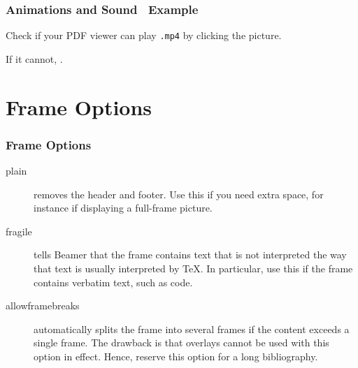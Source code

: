 \documentclass[UKenglish, unknownkeysallowed]{beamer}
\begin{document}
\begin{frame}
    \frametitle{Animations and Sound \textthreequartersemdash\ Example}

    Check if your PDF viewer can play \texttt{.mp4} by clicking the picture.

    \begin{center}
    \end{center}

    If it cannot, .
\end{frame}


\section{Frame Options}


\begin{frame}
    \frametitle{Frame Options}

    \begin{description}
        \item[plain]
        removes the header and footer.
        Use this if you need extra space,
        for instance if displaying a full-frame picture.

        \item[fragile]
        tells Beamer that the frame contains text that is not interpreted the way that text is usually interpreted by \TeX.
        In particular, use this if the frame contains verbatim text, such as code.

        \item[allowframebreaks]
        automatically splits the frame into several frames if the content exceeds a single frame.
        The drawback is that overlays cannot be used with this option in effect.
        Hence, reserve this option for a long bibliography.
    \end{description}
\end{frame}
\end{document}
